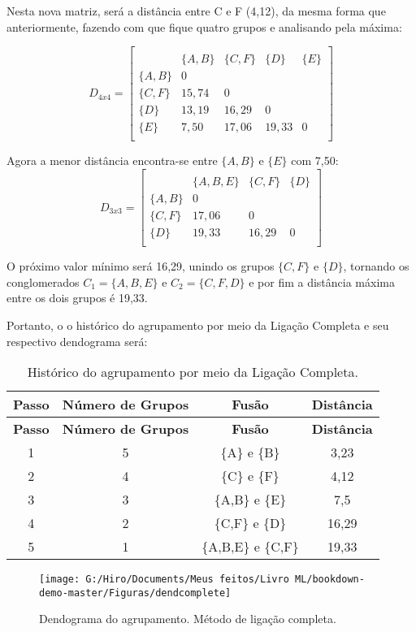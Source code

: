 \documentclass[
  openany]{book}
\begin{document}
Nesta nova matriz, será a distância entre C e F (4,12), da mesma forma que anteriormente, fazendo com que fique quatro grupos e analisando pela máxima:

\[D_{4x4}=\begin{bmatrix}\\
 &\{A,B\}& \{C,F\}&\{D\}&\{E\} \\
 \{A,B\}&0&&\\
 \{C,F\} & 15,74&0&&\\
 \{D\}& 13,19& 16,29&0&\\
 \{E\}& 7,50& 17,06& 19,33&0\\
\end{bmatrix}\]

Agora a menor distância encontra-se entre \(\{A,B\}\) e \(\{E\}\) com 7,50:
\[D_{3x3}=\begin{bmatrix}\\
 &\{A,B,E\}& \{C,F\}&\{D\} \\
 \{A,B\}&0&\\
 \{C,F\} & 17,06&0&\\
 \{D\}& 19,33& 16,29&0\\
\end{bmatrix}\]

O próximo valor mínimo será 16,29, unindo os grupos \(\{C,F\}\) e \(\{D\}\), tornando os conglomerados \(C_1=\{A,B,E\}\) e \(C_2=\{C,F,D\}\) e por fim a distância máxima entre os dois grupos é 19,33.

Portanto, o o histórico do agrupamento por meio da Ligação Completa e seu respectivo dendograma será:

\begin{longtable}[]{@{}cccc@{}}
\caption{\label{tab:ligcomplet} Histórico do agrupamento por meio da Ligação Completa.}\tabularnewline
\toprule
\textbf{Passo} & \textbf{Número de Grupos} & \textbf{Fusão} & \textbf{Distância}\tabularnewline
\midrule
\endfirsthead
\toprule
\textbf{Passo} & \textbf{Número de Grupos} & \textbf{Fusão} & \textbf{Distância}\tabularnewline
\midrule
\endhead
1 & 5 & \{A\} e \{B\} & 3,23\tabularnewline
2 & 4 & \{C\} e \{F\} & 4,12\tabularnewline
3 & 3 & \{A,B\} e \{E\} & 7,5\tabularnewline
4 & 2 & \{C,F\} e \{D\} & 16,29\tabularnewline
5 & 1 & \{A,B,E\} e \{C,F\} & 19,33\tabularnewline
\bottomrule
\end{longtable}

\begin{figure}

{\centering \texttt{[image: G:/Hiro/Documents/Meus feitos/Livro ML/bookdown-demo-master/Figuras/dendcomplete]} 

}

\caption{Dendograma do agrupamento. Método de ligação completa.}\label{fig:dendcomplete}
\end{figure}
\end{document}
